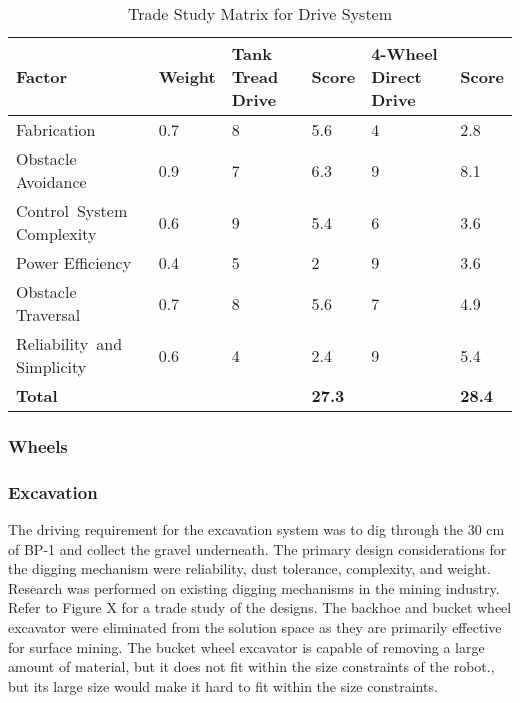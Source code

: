 \documentclass[class=article, crop=false]{standalone}
\begin{document}
\FloatBarrier
	\begin{table}[h]
	\footnotesize
	\centering
	\begin{tabular}{ | p{8em} | m{4em} | m{6em} | m{3em} | m{8em} | m{3em} | }
 	\hline
 		\rowcolor[gray]{0.8}
 		\textbf{Factor} &\textbf{Weight} &\textbf{Tank Tread Drive} &\textbf{Score} &\textbf{4-Wheel Direct Drive} &\textbf{Score}  \\ 
 		\hline
		Fabrication                       &  0.7  &  8    &  5.6  &  4    &  2.8   \\ 
 		\hline
 		Obstacle \mbox{Avoidance}         &  0.9  &  7    &  6.3  &  9    &  8.1   \\ 
 		\hline
 		\mbox{Control System} Complexity  &  0.6  &  9    &  5.4  &  6    &  3.6   \\
 		\hline
 		Power \mbox{Efficiency}           &  0.4  &  5    &  2    &  9    &  3.6   \\ 
 		\hline
 		Obstacle \mbox{Traversal}         &  0.7  &  8    &  5.6  &  7    &  4.9   \\
 		\hline
 		\mbox{Reliability and} Simplicity &  0.6  &  4    &  2.4  &  9    &  5.4   \\
 		\hline
 		\rowcolor[gray]{0.9}
 		\textbf{Total}                    &       &       &\textbf{27.3}&       &\textbf{28.4}\\
 		\hline
	\end{tabular}
	\caption{Trade Study Matrix for Drive System }
		\label{table:drive_trade_study}
	\end{table}
	\FloatBarrier
	
	\subsubsection{Wheels}
	
	\subsubsection{Excavation}
	The driving requirement for the excavation system was to dig through the 30 cm of BP-1 and collect the gravel underneath. The primary design considerations for the digging mechanism were reliability, dust tolerance, complexity, and weight. 
Research was performed on existing digging mechanisms in the mining industry. Refer to Figure X for a trade study of the designs. The backhoe and bucket wheel excavator were eliminated from the solution space as they are primarily effective for surface mining.  The bucket wheel excavator is capable of removing a large amount of material, but it does not fit within the size constraints of the robot., but its large size would make it hard to fit within the size constraints. 
\end{document}
